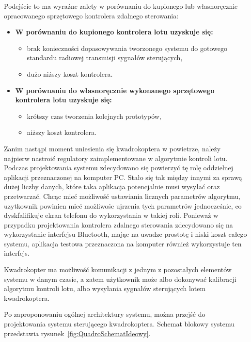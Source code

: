 Podejście to ma wyraźne zalety w porównaniu do kupionego lub własnoręcznie opracowanego sprzętowego kontrolera zdalnego sterowania:

\begin{itemize}
	\item \textbf{W porównaniu do kupionego kontrolera lotu uzyskuje się:}
		\begin{itemize}
			\item brak konieczności dopasowywania tworzonego systemu do gotowego standardu radiowej transmisji sygnałów sterujących,
			\item dużo niższy koszt kontrolera.
		\end{itemize}
	\item \textbf{W porównaniu do własnoręcznie wykonanego sprzętowego kontrolera lotu uzyskuje się:}
		\begin{itemize}
			\item krótszy czas tworzenia kolejnych prototypów,
			\item niższy koszt kontrolera.
		\end{itemize}
\end{itemize}

Zanim nastąpi moment uniesienia się kwadrokoptera w powietrze, należy najpierw nastroić regulatory zaimplementowane w algorytmie kontroli lotu. Podczas projektowania systemu zdecydowano się powierzyć tę rolę oddzielnej aplikacji przeznaczonej na komputer PC. Stało się tak między innymi za sprawą dużej liczby danych, które taka aplikacja potencjalnie musi wysyłać oraz przetwarzać. Chcąc mieć możliwość ustawiania licznych parametrów algorytmu, uzytkownik powinien mieć możliwośc ujrzenia tych parametrów jednocześnie, co dyskfalifikuje ekran telefonu do wykorzystania w takiej roli. Ponieważ w przypadku projektowania kontrolera zdalnego sterowania zdecydowano się na wykorzystanie interfejsu Bluetooth, mając na uwadze prostotę i niski koszt całego systemu, aplikacja testowa przeznaczona na komputer również wykorzystuje ten interfejs.

Kwadrokopter ma możliwość komunikacji z jednym z pozostałych elementów systemu w danym czasie, a zatem użytkownik może albo dokonywać kalibracji algorytmu kontroli lotu, albo wysyłania sygnałów sterujących lotem kwadrokoptera.

Po zaproponowaniu ogólnej architektury systemu, można przejść do projektowania systemu sterującego kwadrokoptera. Schemat blokowy systemu przedstawia rysunek~\ref{fig:QuadroSchematIdeowy}.

